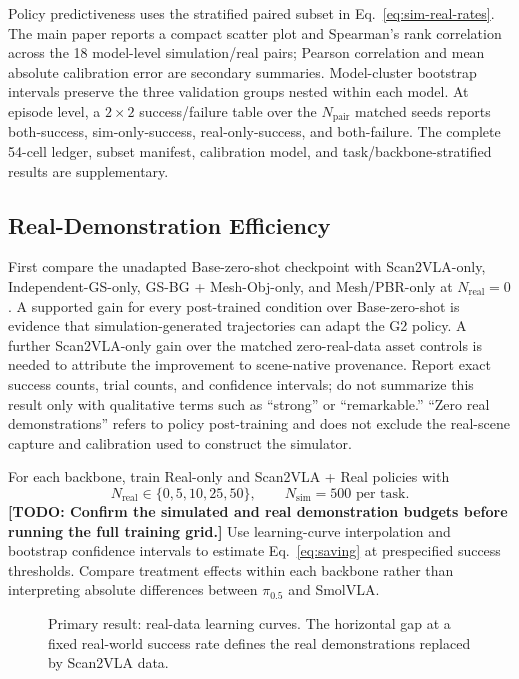 \documentclass[letterpaper,10pt,conference]{ieeeconf}
\newcommand{\todo}[1]{\textbf{[TODO: #1]}}
\newcommand{\piHalf}{\ensuremath{\pi_{0.5}}}
\begin{document}
Policy predictiveness uses the stratified paired subset in
Eq.~\eqref{eq:sim-real-rates}. The main paper reports a compact scatter plot and
Spearman's rank correlation across the 18 model-level simulation/real pairs;
Pearson correlation and mean absolute calibration error are secondary summaries.
Model-cluster bootstrap intervals preserve the three validation groups nested
within each model. At episode level, a $2\times2$ success/failure table over the
$N_{\mathrm{pair}}$ matched seeds reports both-success, sim-only-success,
real-only-success, and both-failure. The complete 54-cell ledger, subset manifest,
calibration model, and task/backbone-stratified results are supplementary.

\subsection{Real-Demonstration Efficiency}
First compare the unadapted Base-zero-shot checkpoint with Scan2VLA-only,
Independent-GS-only, GS-BG + Mesh-Obj-only, and Mesh/PBR-only at
$N_{\mathrm{real}}=0$. A supported gain for every post-trained condition over
Base-zero-shot is evidence that simulation-generated trajectories can adapt the
  G2 policy. A further Scan2VLA-only gain over the matched zero-real-data asset
controls is needed to attribute the improvement to scene-native provenance.
Report exact success counts, trial counts, and confidence intervals; do not
summarize this result only with qualitative terms such as ``strong'' or
``remarkable.'' ``Zero real demonstrations'' refers to policy post-training and
does not exclude the real-scene capture and calibration used to construct the
simulator.

For each backbone, train Real-only and Scan2VLA + Real policies with
\begin{equation}
  N_{\mathrm{real}} \in \{0,5,10,25,50\}, \qquad
  N_{\mathrm{sim}} = 500 \text{ per task}.
  \label{eq:data-budgets}
\end{equation}
\todo{Confirm the simulated and real demonstration budgets before running the
full training grid.}
Use learning-curve interpolation and bootstrap confidence intervals to estimate
Eq.~\eqref{eq:saving} at prespecified success thresholds. Compare treatment
effects within each backbone rather than interpreting absolute differences
between \piHalf{} and SmolVLA.

\begin{figure}[t]
  \centering
  \caption{Primary result: real-data learning curves. The horizontal gap at a
  fixed real-world success rate defines the real demonstrations replaced by
  Scan2VLA data.}
  \label{fig:data-efficiency}
\end{figure}
\end{document}
